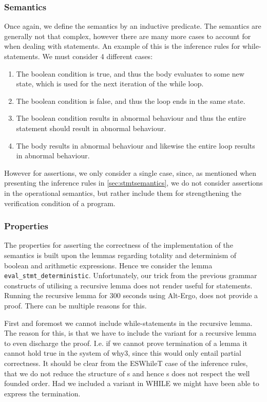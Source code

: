 \subsubsection{Semantics}
Once again, we define the semantics by an inductive predicate. The semantics are generally not that complex,
however there are many more cases to account for when dealing with statements.
An example of this is the inference rules for while-statements.
We must consider 4 different cases:

\begin{enumerate}
  \item The boolean condition is true, and thus the body evaluates to some new state, which is used for the next iteration of the while loop.
  \item The boolean condition is false, and thus the loop ends in the same state.
  \item The boolean condition results in abnormal behaviour and thus the entire statement should result in abnormal behaviour.
  \item The body results in abnormal behaviour and likewise the entire loop results in abnormal behaviour.
\end{enumerate}

However for assertions, we only consider a single case, since, as mentioned when presenting the inference rules in \ref{sec:stmtsemantics},
we do not consider assertions in the operational semantics, but rather include them for strengthening the
verification condition of a program.

\subsubsection{Properties}
The properties for asserting the correctness of the implementation of the semantics is built
upon the lemmas regarding totality and determinism of boolean and arithmetic expressions.
Hence we consider the lemma
\texttt{eval_stmt_deterministic}. Unfortunately, our trick from the previous grammar constructs of utilising a recursive lemma does not render useful for statements.
Running the recursive lemma for 300 seconds using Alt-Ergo, does not provide a proof.
There can be multiple reasons for this.

First and foremost we cannot include while-statements in the recursive lemma. The reason for this, is that we have to
include the variant for a recursive lemma to even discharge the proof.
I.e. if we cannot prove termination of a lemma it cannot hold true in the system of why3, since this would only entail partial correctness.
It should be clear from the ESWhileT case of the inference rules, that we do not reduce the structure of s and hence s does not respect the well founded order.
Had we included a variant in WHILE we might have been able to express the termination.

